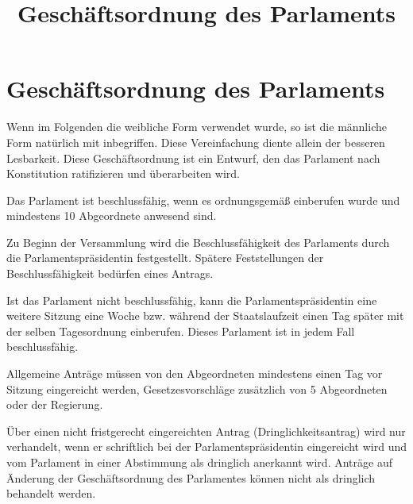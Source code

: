 \documentclass{sasbase}
\begin{document}
\title{Gesch\"{a}ftsordnung des Parlaments}

\setcounter{secnumdepth}{5}

\mytitle

\parensstyle

\section{Gesch\"{a}ftsordnung des Parlaments}
Wenn im Folgenden die weibliche Form verwendet wurde, so ist die m\"{a}nnliche Form nat\"{u}rlich mit inbegriffen. Diese Vereinfachung diente allein der besseren Lesbarkeit. Diese Gesch\"{a}ftsordnung ist ein Entwurf, den das Parlament nach Konstitution ratifizieren und \"{u}berarbeiten wird. 
\begin{article}[Beschlussfähigkeit]
	\item Das Parlament ist beschlussfähig, wenn es ordnungsgemäß einberufen wurde und mindestens 10 Abgeordnete anwesend sind.
	\item Zu Beginn der Versammlung wird die Beschlussfähigkeit des Parlaments durch die Parlamentspr\"{a}sidentin festgestellt. Spätere Feststellungen der Beschlussfähigkeit bedürfen eines Antrags.
	\item Ist das Parlament nicht beschlussfähig, kann die Parlamentspr\"{a}sidentin eine weitere Sitzung eine Woche bzw. während der Staatslaufzeit einen Tag später mit der selben Tagesordnung einberufen. Dieses Parlament ist in jedem Fall beschlussfähig.
\end{article}
\begin{article}[Anträge]
	\item Allgemeine Antr\"{a}ge m\"{u}ssen von den Abgeordneten mindestens einen Tag vor Sitzung eingereicht werden, Gesetzesvorschl\"{a}ge zus\"{a}tzlich von 5 Abgeordneten oder der Regierung.
	\item Über einen nicht fristgerecht eingereichten Antrag (Dringlichkeitsantrag) wird nur verhandelt, wenn er schriftlich bei der Parlamentspr\"{a}sidentin eingereicht wird und vom Parlament in einer Abstimmung als dringlich anerkannt wird. Anträge auf Änderung der Geschäftsordnung des Parlamentes können nicht als dringlich behandelt werden.
\end{article}
\end{document}
